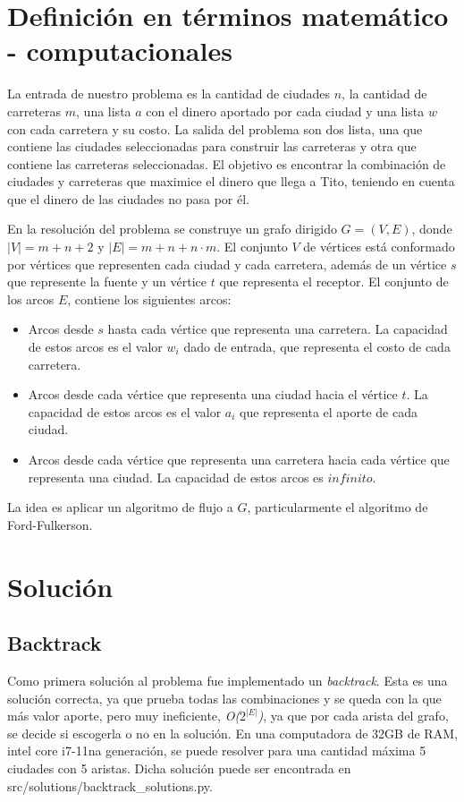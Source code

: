 \documentclass[10pt]{article} %
\begin{document}
	\section{Definici\'on en t\'erminos matem\'atico - computacionales}\label{section_2}
	
	La entrada de nuestro problema es la cantidad de ciudades $n$, la cantidad de carreteras $m$, una lista $a$ con el dinero aportado por cada ciudad y una lista $w$ con cada carretera y su costo. La salida del problema son dos lista, una que contiene las ciudades seleccionadas para construir las carreteras y otra que contiene las carreteras seleccionadas. El objetivo es encontrar la combinaci\'on de ciudades y carreteras que maximice el dinero que llega a Tito, teniendo en cuenta que el dinero de las ciudades no pasa por \'el.
	
	En la resoluci\'on del problema se construye un grafo dirigido $G=(V,E)$, donde $|V| = m + n + 2$ y $|E|= m + n + n \cdot m$. El conjunto $V$ de v\'ertices est\'a conformado por v\'ertices que representen cada ciudad y cada carretera, adem\'as de un v\'ertice $s$ que represente la fuente y un v\'ertice $t$ que representa el receptor. El conjunto de los arcos $E$, contiene los siguientes arcos:
	\begin{itemize}
		\item Arcos desde $s$ hasta cada v\'ertice que representa una carretera. La capacidad de estos arcos es el valor $w_i$ dado de entrada, que representa el costo de cada carretera.
		
		\item Arcos desde cada v\'ertice que representa una ciudad hacia el v\'ertice $t$. La capacidad de estos arcos es el valor $a_i$ que representa el aporte de cada ciudad.
		
		\item Arcos desde cada v\'ertice que representa una carretera hacia cada v\'ertice que representa una ciudad. La capacidad de estos arcos es $infinito$.
		
	\end{itemize}

	La idea es aplicar un algoritmo de flujo a $G$, particularmente el algoritmo de Ford-Fulkerson. 
	
	\section{Soluci\'on}
	
	\subsection{Backtrack}
		Como primera solución al problema fue implementado un \textit{backtrack}. Esta es una solución correcta, ya que prueba todas las combinaciones y se queda con la que más valor aporte, pero muy ineficiente, \textit{O($2^{|E|}$)}, ya que por cada arista del grafo, se decide si escogerla o no en la soluci\'on. En una computadora de 32GB de RAM, intel core i7-11na generación, se puede resolver para una cantidad máxima 5 ciudades con 5 aristas. Dicha solución puede ser encontrada en src/solutions/backtrack\_solutions.py.
	
\end{document}

